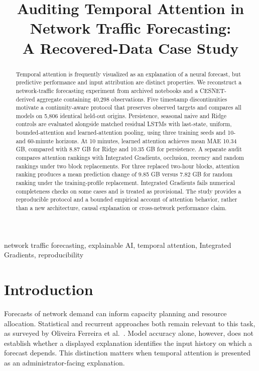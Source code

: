 \documentclass[conference]{IEEEtran}
\title{Auditing Temporal Attention in Network Traffic Forecasting:\\A Recovered-Data Case Study}
\author{\IEEEauthorblockN{Anonymous Research Draft}}
\begin{document}
\maketitle
\begin{abstract}
Temporal attention is frequently visualized as an explanation of a neural forecast, but predictive performance and input attribution are distinct properties. We reconstruct a network-traffic forecasting experiment from archived notebooks and a CESNET-derived aggregate containing 40,298 observations. Five timestamp discontinuities motivate a continuity-aware protocol that preserves observed targets and compares all models on 5,806 identical held-out origins. Persistence, seasonal naive and Ridge controls are evaluated alongside matched residual LSTMs with last-state, uniform, bounded-attention and learned-attention pooling, using three training seeds and 10- and 60-minute horizons. At 10 minutes, learned attention achieves mean MAE 10.34 GB, compared with 8.87 GB for Ridge and 10.35 GB for persistence. A separate audit compares attention rankings with Integrated Gradients, occlusion, recency and random rankings under two block replacements. For three replaced two-hour blocks, attention ranking produces a mean prediction change of 9.85 GB versus 7.82 GB for random ranking under the training-profile replacement. Integrated Gradients fails numerical completeness checks on some cases and is treated as provisional. The study provides a reproducible protocol and a bounded empirical account of attention behavior, rather than a new architecture, causal explanation or cross-network performance claim.
\end{abstract}
\begin{IEEEkeywords}
network traffic forecasting, explainable AI, temporal attention, Integrated Gradients, reproducibility
\end{IEEEkeywords}

\section{Introduction}
Forecasts of network demand can inform capacity planning and resource allocation. Statistical and recurrent approaches both remain relevant to this task, as surveyed by Oliveira Ferreira et al.~\cite{survey}. Model accuracy alone, however, does not establish whether a displayed explanation identifies the input history on which a forecast depends. This distinction matters when temporal attention is presented as an administrator-facing explanation.
\end{document}

